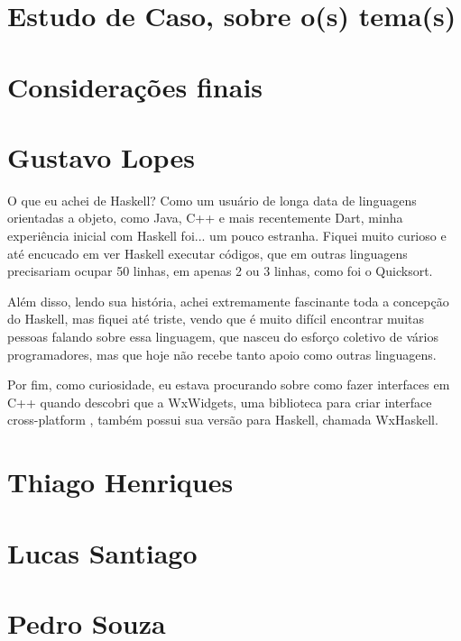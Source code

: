 \documentclass[
  article,			       %
  12pt,				         %
  oneside,			       %
  a4paper,			       %
  english,		       	 %
  brazil,			      	 %
  sumario=tradicional
]{abntex2}
\begin{document}
      


    \newpage

    \chapter{Estudo de Caso, sobre o(s) tema(s)}

    \newpage

    \chapter{Considerações finais}

    \begin{apendicesenv}

        \partapendices
        \chapter{Gustavo Lopes}

        O que eu achei de Haskell? Como um usuário de longa data de linguagens orientadas a objeto, 
        como Java, C++ e mais recentemente Dart, minha experiência inicial com Haskell foi...
        um pouco estranha. Fiquei muito curioso e até encucado em ver Haskell executar códigos, que em
        outras linguagens precisariam ocupar 50 linhas, em apenas 2 ou 3 linhas, como foi o Quicksort.

        Além disso, lendo sua história, achei extremamente fascinante toda a concepção do Haskell,
        mas fiquei até triste, vendo que é muito difícil encontrar muitas pessoas falando sobre essa linguagem, que nasceu 
        do esforço coletivo de vários programadores, mas que hoje não recebe tanto apoio como outras linguagens.

        Por fim, como curiosidade, eu estava procurando sobre como fazer interfaces em C++ quando
        descobri que a WxWidgets, uma biblioteca para criar interface cross-platform , também possui 
        sua versão para Haskell, chamada WxHaskell.

        \newpage

        \chapter{Thiago Henriques}

        \newpage 

        \chapter{Lucas Santiago}

        \newpage

        \chapter{Pedro Souza}




    
    \end{apendicesenv}
\end{document}
